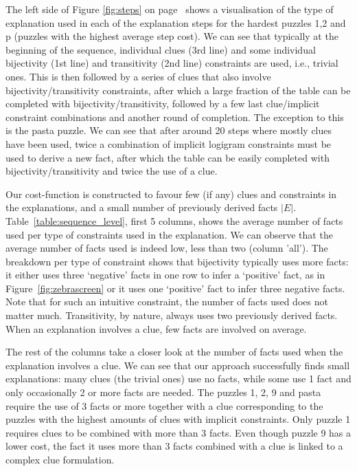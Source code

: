 The left side of Figure \ref{fig:steps} on page~\pageref{fig:steps} shows a visualisation of the type of explanation used in each of the explanation steps for the hardest puzzles 1,2 and p (puzzles with the highest average step cost). 
We can see that typically at the beginning of the sequence, individual clues (3rd line) and some individual bijectivity (1st line) and transitivity (2nd line) constraints are used, i.e., trivial ones.
This is then followed by a series of clues that also involve bijectivity/transitivity constraints, after which a large fraction of the table can be completed with bijectivity/transitivity, followed by a few last clue/implicit constraint combinations and another round of completion.
The exception to this is the pasta puzzle.
We can see that after around 20 steps where mostly clues have been used, twice a combination of implicit logigram constraints must be used to derive a new fact, after which the table can be easily completed with bijectivity/transitivity and twice the use of a clue.


Our cost-function is constructed to favour few (if any) clues and constraints in the explanations, and a small number of previously derived facts $|E|$.
Table~\ref{table:sequence_level}, first 5 columns, shows the average number of facts used per type of constraints used in the explanation.
We can observe that the average number of facts used is indeed low, less than two (column 'all').
The breakdown per type of constraint shows that bijectivity typically uses more facts: it either uses three `negative' facts in one row to infer a `positive' fact, as in Figure~\ref{fig:zebrascreen} or it uses one `positive' fact to infer three negative facts.
Note that for such an intuitive constraint, the number of facts used does not matter much. 
Transitivity, by nature, always uses two previously derived facts.
When an explanation involves a clue, few facts are involved on average. 

The rest of the columns take a closer look at the number of facts used when the explanation involves a clue. We can see that our approach successfully finds small explanations: many clues (the trivial ones) use no facts, while some use 1 fact and only occasionally 2 or more facts are needed. 
The puzzles 1, 2, 9 and pasta require the use of 3 facts or more together with a clue corresponding to the puzzles with the highest amounts of clues with implicit constraints. Only puzzle 1 requires clues to be combined with more than 3 facts.
Even though puzzle 9 has a lower cost, the fact it uses more than 3 facts combined with a clue is linked to a complex clue formulation.

